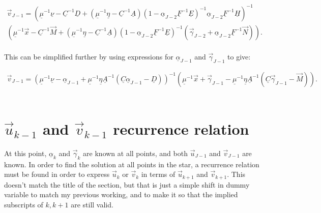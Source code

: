 \documentclass[11pt]{amsart}
\begin{document}
\begin{multline} \label{eq:v_J-1_long}
\vec{v}_{J-1}  =   \left(    \underline{\mu}^{-1} \underline{\nu}   - \underline{C}^{-1} \underline{D}  +  \left(   \underline{\mu}^{-1} \underline{\eta}  - \underline{C}^{-1} \underline{A}  \right)  \left(   1  - \underline{\alpha}_{J-2} \underline{F}^{-1} \underline{E}  \right)^{-1} \underline{\alpha}_{J-2}  \underline{F}^{-1} \underline{H}  \right)^{-1}    \\
\left(   \underline{\mu}^{-1} \vec{x}  -  \underline{C}^{-1} \vec{M}  +   \left(   \underline{\mu}^{-1} \underline{\eta}  - \underline{C}^{-1} \underline{A}  \right)  \left(   1  - \underline{\alpha}_{J-2} \underline{F}^{-1} \underline{E}  \right)^{-1}   \left(    \vec{\gamma}_{J-2}  +  \underline{\alpha}_{J-2} \underline{F}^{-1}  \vec{N}   \right)  \right)  .
\end{multline}
\\
This can be simplified further by using expressions for $\underline{\alpha}_{J-1}$ and $\vec{\gamma}_{J-1}$ to give:

\begin{multline} \label{eq:v_J-1}
\vec{v}_{J-1}  =   \left(    \underline{\mu}^{-1} \underline{\nu}   - \underline{\alpha}_{J-1}  +  \underline{\mu}^{-1} \underline{\eta} \underline{A}^{-1} \left( \underline{C} \underline{\alpha}_{J-1}  -  \underline{D} \right)  \right)^{-1}    
\left(   \underline{\mu}^{-1} \vec{x}  +  \vec{\gamma}_{J-1}  -   \underline{\mu}^{-1} \underline{\eta} \underline{A}^{-1} \left(   \underline{C} \vec{\gamma}_{J-1} - \vec{M}   \right)  \right)  .
\end{multline}
\\








\section{$\vec{u}_{k-1}$ and $\vec{v}_{k-1}$ recurrence relation}

At this point, $\underline{\alpha}_{k}$ and $\vec{\gamma}_{k}$ are known at all points, and both $\vec{u}_{J-1}$ and $\vec{v}_{J-1}$ are known.  In order to find the solution at all points in the star, a recurrence relation must be found in order to express $\vec{u}_{k}$ or $\vec{v}_{k}$ in terms of $\vec{u}_{k+1}$ and $\vec{v}_{k+1}$.  This doesn't match the title of the section, but that is just a simple shift in dummy variable to match my previous working, and to make it so that the implied subscripts of $k,k+1$ are still valid.
\end{document}
